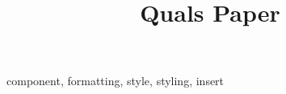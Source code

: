 \documentclass[conference]{IEEEtran}
\begin{document}
	\title{Quals Paper}

	\author{
	}

	\maketitle

	\begin{abstract}
		
	\end{abstract}

	\begin{IEEEkeywords}
	component, formatting, style, styling, insert
	\end{IEEEkeywords}

	

	
	{}
\end{document}
